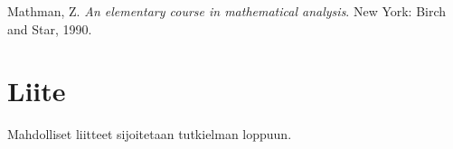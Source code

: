 \documentclass[a4paper,12pt,leqno,oneside]{report} %
\theoremstyle{plain}
\theoremstyle{definition}
\theoremstyle{remark}
\numberwithin{equation}{chapter}
\begin{document}
\begin{thebibliography}{9}

Mathman, Z. \emph{An elementary course in mathematical analysis}.
New York: Birch and Star, 1990.

\end{thebibliography}


\chapter*{Liite}

Mahdolliset liitteet sijoitetaan tutkielman loppuun.

%
\end{document}
